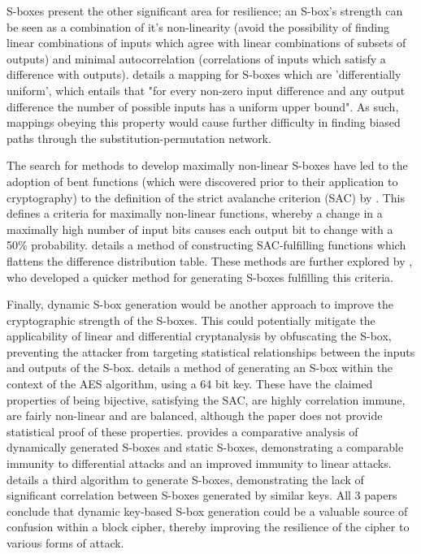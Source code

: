 \documentclass[british,10pt,a4paper]{article}
\begin{document}
S-boxes present the other significant area for resilience; an S-box's strength can be seen as a combination of it's non-linearity (avoid the possibility of finding linear combinations of inputs which agree with linear combinations of subsets of outputs) and minimal autocorrelation (correlations of inputs which satisfy a difference with outputs). \citet{nyberg} details a mapping for S-boxes which are 'differentially uniform', which entails that "for every non-zero input difference and any output difference the number of possible inputs has a uniform upper bound". As such, mappings obeying this property would cause further difficulty in finding biased paths through the substitution-permutation network.  

The search for methods to develop maximally non-linear S-boxes have led to the adoption of bent functions (which were discovered prior to their application to cryptography) to the definition of the strict avalanche criterion (SAC) by \citet{Forre1990-ll}. This defines a criteria for maximally non-linear functions, whereby a change in a maximally high number of input bits causes each output bit to change with a 50\% probability. \citeauthor{Forre1990-ll} details a method of constructing SAC-fulfilling functions which flattens the difference distribution table. These methods are further explored by \citet{Adams1990-nz}, who developed a quicker method for generating S-boxes fulfilling this criteria.

Finally, dynamic S-box generation would be another approach to improve the cryptographic strength of the S-boxes. This could potentially mitigate the applicability of linear and differential cryptanalysis by obfuscating the S-box, preventing the attacker from targeting statistical relationships between the inputs and outputs of the S-box. \citet{Jacob2015-uk} details a method of generating an S-box within the context of the AES algorithm, using a 64 bit key. These have the claimed properties of being bijective, satisfying the SAC, are highly correlation immune, are fairly non-linear and are balanced, although the paper does not provide statistical proof of these properties. \citet{Zaibi2009-se} provides a comparative analysis of dynamically generated S-boxes and static S-boxes, demonstrating a comparable immunity to differential attacks and an improved immunity to linear attacks. \citet{Hosseinkhani2012-in} details a third algorithm to generate S-boxes, demonstrating the lack of significant correlation between S-boxes generated by similar keys. All 3 papers conclude that dynamic key-based S-box generation could be a valuable source of confusion within a block cipher, thereby improving the resilience of the cipher to various forms of attack.
\end{document}
